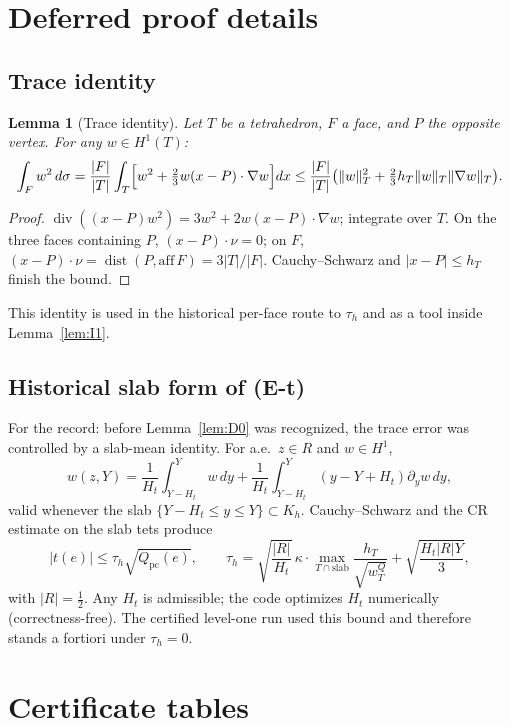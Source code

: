 \documentclass[11pt]{amsart}
\newtheorem{lemma}[theorem]{Lemma}
\begin{document}
\section{Deferred proof details}

\subsection*{Trace identity}

\begin{lemma}[Trace identity]\label{lem:T}
Let $T$ be a tetrahedron, $F$ a face, and $P$ the opposite vertex.  For
any $w\in H^1(T)$:
\[
  \int_F w^2\,d\sigma
  =\frac{|F|}{|T|}\int_T\Bigl[w^2+\tfrac23 w(x-P)\cdot\nabla w\Bigr]dx
  \le\frac{|F|}{|T|}\bigl(\|w\|_T^2+\tfrac23 h_T\|w\|_T\|\nabla w\|_T\bigr).
\]
\end{lemma}

\begin{proof}
$\operatorname{div}((x-P)w^2)=3w^2+2w(x-P)\cdot\nabla w$; integrate over
$T$.  On the three faces containing $P$, $(x-P)\cdot\nu=0$; on $F$,
$(x-P)\cdot\nu=\operatorname{dist}(P,\mathrm{aff}\,F)=3|T|/|F|$.
Cauchy--Schwarz and $|x-P|\le h_T$ finish the bound.
\end{proof}

This identity is used in the historical per-face route to $\tau_h$ and as
a tool inside Lemma~\ref{lem:I1}.

\subsection*{Historical slab form of (E-t)}

For the record: before Lemma~\ref{lem:D0} was recognized, the trace error
was controlled by a slab-mean identity.  For a.e.\ $z\in R$ and
$w\in H^1$,
\[
  w(z,Y)=\frac1{H_t}\int_{Y-H_t}^Y w\,dy
  +\frac1{H_t}\int_{Y-H_t}^Y(y-Y+H_t)\partial_y w\,dy,
\]
valid whenever the slab $\{Y-H_t\le y\le Y\}\subset K_h$.  Cauchy--Schwarz
and the CR estimate on the slab tets produce
\[
  |t(e)|\le\tau_h\sqrt{Q_{\mathrm{pc}}(e)},\qquad
  \tau_h=\sqrt{\frac{|R|}{H_t}}\,\kappa\cdot\max_{T\cap\mathrm{slab}}
  \frac{h_T}{\sqrt{w_T^Q}}
  +\sqrt{\frac{H_t|R|Y}{3}},
\]
with $|R|=\tfrac12$.  Any $H_t$ is admissible; the code optimizes $H_t$
numerically (correctness-free).  The certified level-one run used this
bound and therefore stands a fortiori under $\tau_h=0$.

\section{Certificate tables}
\end{document}
